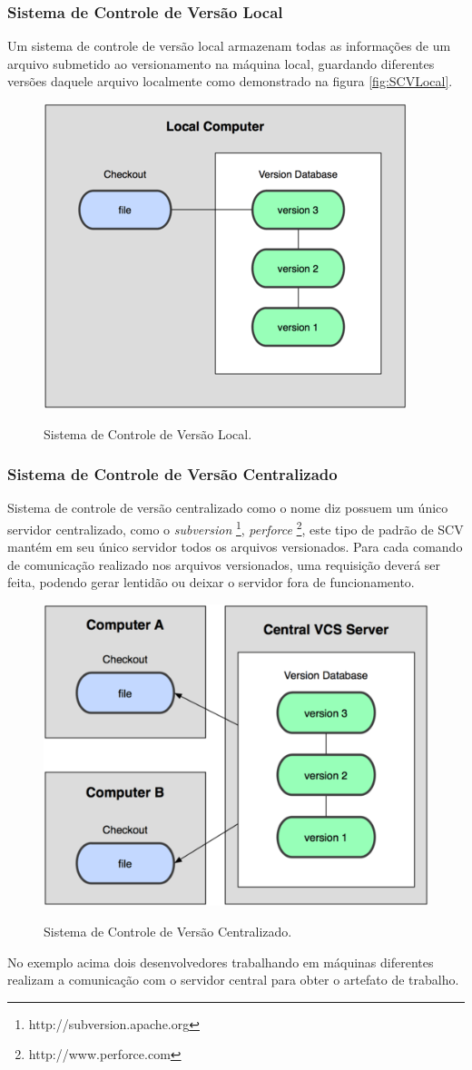 \subsubsection{Sistema de Controle de Versão Local}
Um sistema de controle de versão local	armazenam todas as informações de um arquivo submetido ao versionamento na máquina local, guardando diferentes versões daquele arquivo localmente como demonstrado na figura \autoref{fig:SCVLocal}.
\begin{figure}[h]
\centering
\caption[Sistema de Controle de Versão Local]{Sistema de Controle de Versão Local.}
\includegraphics[width=0.5\linewidth]{./images/scvlocal}
\label{fig:SCVLocal}
\end{figure}
\subsubsection{Sistema de Controle de Versão Centralizado} Sistema de controle de versão centralizado como o nome diz possuem um único servidor centralizado, como o \textit{subversion} \footnote{http://subversion.apache.org}, \textit{perforce} \footnote{http://www.perforce.com}, este tipo de padrão de SCV mantém em seu único servidor todos os arquivos versionados. Para cada comando de comunicação realizado nos arquivos versionados, uma requisição deverá ser feita, podendo gerar lentidão ou deixar o servidor fora de funcionamento.
\begin{figure}[h]
\centering
\caption[Sistema de Controle de Versão Centralizado]{Sistema de Controle de Versão Centralizado.}
\includegraphics[width=0.5\linewidth]{./images/scvcentral}
\label{fig:SCVCentral}
\end{figure}
No exemplo acima dois desenvolvedores trabalhando em máquinas diferentes realizam a comunicação com o servidor central para obter o artefato de trabalho.	
